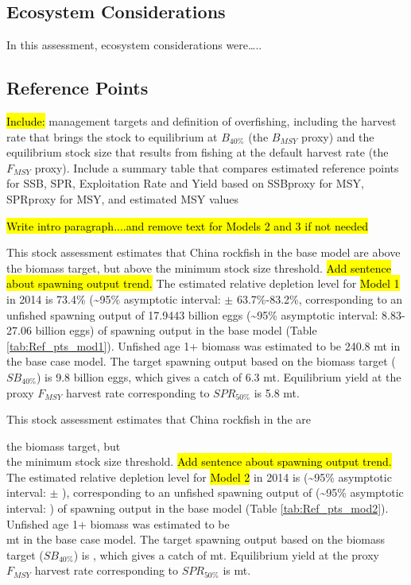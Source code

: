 \documentclass[12pt,]{article}
\begin{document}
\FloatBarrier

\subsection*{Ecosystem Considerations}\label{ecosystem-considerations}

In this assessment, ecosystem considerations were\ldots{}..

\subsection*{Reference Points}\label{reference-points}

\hl{Include:} management targets and definition of overfishing,
including the harvest rate that brings the stock to equilibrium at
\(B_{40\%}\) (the \(B_{MSY}\) proxy) and the equilibrium stock size that
results from fishing at the default harvest rate (the \(F_{MSY}\)
proxy). Include a summary table that compares estimated reference points
for SSB, SPR, Exploitation Rate and Yield based on SSBproxy for MSY,
SPRproxy for MSY, and estimated MSY values

\hl{Write intro paragraph....and remove text for Models 2 and 3 if not needed}

This stock assessment estimates that China rockfish in the base model
are above the biomass target, but above the minimum stock size
threshold. \hl{Add sentence about spawning output trend.} The estimated
relative depletion level for \hl{Model 1} in 2014 is 73.4\%
(\textasciitilde{}95\% asymptotic interval: \(\pm\) 63.7\%-83.2\%,
corresponding to an unfished spawning output of 17.9443 billion eggs
(\textasciitilde{}95\% asymptotic interval: 8.83-27.06 billion eggs) of
spawning output in the base model (Table \ref{tab:Ref_pts_mod1}).
Unfished age 1+ biomass was estimated to be 240.8 mt in the base case
model. The target spawning output based on the biomass target
(\(SB_{40\%}\)) is 9.8 billion eggs, which gives a catch of 6.3 mt.
Equilibrium yield at the proxy \(F_{MSY}\) harvest rate corresponding to
\(SPR_{50\%}\) is 5.8 mt.

This stock assessment estimates that China rockfish in the are

the biomass target, but\\
the minimum stock size threshold.
\hl{Add sentence about spawning output trend.} The estimated relative
depletion level for \hl{Model 2} in 2014 is (\textasciitilde{}95\%
asymptotic interval: \(\pm\) ), corresponding to an unfished spawning
output of (\textasciitilde{}95\% asymptotic interval: ) of spawning
output in the base model (Table \ref{tab:Ref_pts_mod2}). Unfished age 1+
biomass was estimated to be\\
mt in the base case model. The target spawning output based on the
biomass target (\(SB_{40\%}\)) is , which gives a catch of mt.
Equilibrium yield at the proxy \(F_{MSY}\) harvest rate corresponding to
\(SPR_{50\%}\) is mt.
\end{document}
